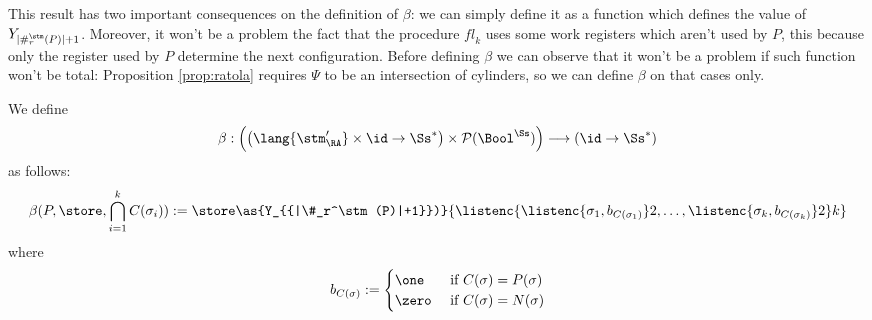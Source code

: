 This result has two important consequences on the definition of $\beta$: we can
simply define it as a function which defines the value of
$Y_{{|\#_r^\stm(P)|+1}}$. Moreover, it won't be a problem the fact that
the procedure $\mathit{fl}_k$ uses some work registers which aren't used by
$P$, this because only the register used by $P$ determine the next configuration.
%
Before defining $\beta$ we can observe that it won't be a problem if such function
won't be total: Proposition \ref{prop:ratola} requires $\Psi$ to be an intersection
of cylinders, so we can define $\beta$ on that cases only.

\begin{defn}
  \label{def:beta}
  We define
  $$
  \beta:\left(\left(\lang {\stm_\RA'}\times\id\to{\Ss^*}\right)\times \mathcal P (\Bool^\Ss) \right)
  \longrightarrow
  \left(\id\to{\Ss^*}\right)
  $$
  as follows:
  \begin{align*}
  \beta(P, \store, \bigcap_{i=1}^k C(\sigma_i))&:= \store \as {Y_{{|\#_r^\stm(P)|+1}})} {\listenc{\listenc {\sigma_1, b_{C(\sigma_1)}} 2, \ldots, \listenc {\sigma_k, b_{C(\sigma_k)}} 2}k}\\
  \end{align*}
  where
  $$
  b_{C(\sigma)}:= \begin{cases}
  \one & \text{ if } C(\sigma)= P(\sigma)\\
  \zero & \text{ if } C(\sigma)= N(\sigma)
  \end{cases}
  $$
\end{defn}

